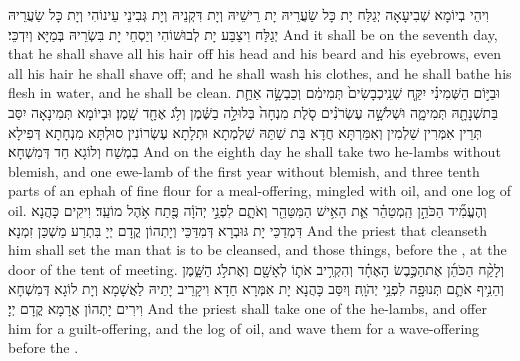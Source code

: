 {וִיהֵי בְיוֹמָא שְׁבִיעָאָה יְגַלַּח יָת כָּל שַׂעֲרֵיהּ יָת רֵישֵׁיהּ וְיָת דִּקְנֵיהּ וְיָת גְּבִינֵי עֵינוֹהִי וְיָת כָּל שַׂעֲרֵיהּ יְגַלַּח וִיצַבַּע יָת לְבוּשׁוֹהִי וְיַסְחֵי יָת בִּשְׂרֵיהּ בְּמַיָּא וְיִדְכֵּי׃}
{And it shall be on the seventh day, that he shall shave all his hair off his head and his beard and his eyebrows, even all his hair he shall shave off; and he shall wash his clothes, and he shall bathe his flesh in water, and he shall be clean.}{}
{וּבַיּ֣וֹם הַשְּׁמִינִ֗י יִקַּ֤ח שְׁנֵֽי\maqqaf כְבָשִׂים֙ תְּמִימִ֔ם וְכַבְשָׂ֥ה אַחַ֛ת בַּת\maqqaf שְׁנָתָ֖הּ תְּמִימָ֑ה וּשְׁלֹשָׁ֣ה עֶשְׂרֹנִ֗ים סֹ֤לֶת מִנְחָה֙ בְּלוּלָ֣ה בַשֶּׁ֔מֶן וְלֹ֥ג אֶחָ֖ד שָֽׁמֶן׃}
{וּבְיוֹמָא תְּמִינָאָה יִסַּב תְּרֵין אִמְּרִין שַׁלְמִין וְאִמַּרְתָּא חֲדָא בַּת שַׁתַּהּ שַׁלְמְתָא וּתְלָתָא עֶשְׂרוֹנִין סוּלְתָּא מִנְחָתָא דְּפִילָא בִמְשַׁח וְלוֹגָא חַד דְּמִשְׁחָא׃}
{And on the eighth day he shall take two he-lambs without blemish, and one ewe-lamb of the first year without blemish, and three tenth parts of an ephah of fine flour for a meal-offering, mingled with oil, and one log of oil.}{}
{וְהֶעֱמִ֞יד הַכֹּהֵ֣ן הַֽמְטַהֵ֗ר אֵ֛ת הָאִ֥ישׁ הַמִּטַּהֵ֖ר וְאֹתָ֑ם לִפְנֵ֣י יְהֹוָ֔ה פֶּ֖תַח אֹ֥הֶל מוֹעֵֽד׃}
{וִיקִים כָּהֲנָא דִּמְדַכֵּי יָת גּוּבְרָא דְּמִדַּכֵּי וְיָתְהוֹן קֳדָם יְיָ בִּתְרַע מַשְׁכַּן זִמְנָא׃}
{And the priest that cleanseth him shall set the man that is to be cleansed, and those things, before the \lord, at the door of the tent of meeting.}{}
{וְלָקַ֨ח הַכֹּהֵ֜ן אֶת\maqqaf הַכֶּ֣בֶשׂ הָאֶחָ֗ד וְהִקְרִ֥יב אֹת֛וֹ לְאָשָׁ֖ם וְאֶת\maqqaf לֹ֣ג הַשָּׁ֑מֶן וְהֵנִ֥יף אֹתָ֛ם תְּנוּפָ֖ה לִפְנֵ֥י יְהֹוָֽה׃}
{וְיִסַּב כָּהֲנָא יָת אִמְּרָא חַדָא וִיקָרֵיב יָתֵיהּ לַאֲשָׁמָא וְיָת לוֹגָא דְּמִשְׁחָא וִירִים יָתְהוֹן אֲרָמָא קֳדָם יְיָ׃}
{And the priest shall take one of the he-lambs, and offer him for a guilt-offering, and the log of oil, and wave them for a wave-offering before the \lord.}{}

